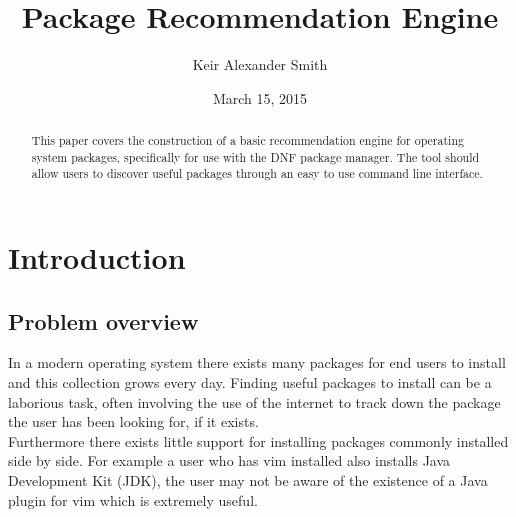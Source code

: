\documentclass{l4proj}
\begin{document}
\title{Package Recommendation Engine}
\author{Keir Alexander Smith}
\date{March 15, 2015}
\maketitle
 
\begin{abstract}
This paper covers the construction of a basic recommendation engine for operating system packages, specifically for use with the DNF package manager. The tool should allow users to discover useful packages through an easy to use command line interface.
\end{abstract}
 
\tableofcontents

\lstset{ %
language=Python,              %
basicstyle=\scriptsize,     %
numbers=left,               %
numberstyle=\scriptsize,    %
numbersep=10pt,             %
frame=trBL,                 %
captionpos=b,               %
breaklines=true,            %
breakatwhitespace=false,    %
showstringspaces=false,     %
frameround=fttt
}
 
 
\chapter{Introduction}
 
\section{Problem overview}
In a modern operating system there exists many packages for end users to install and this collection grows every day. Finding useful packages to install can be a laborious task, often involving the use of the internet to track down the package the user has been looking for, if it exists.\\
Furthermore there exists little support for installing packages commonly installed side by side. For example a user who has vim installed also installs Java Development Kit (JDK), the user may not be aware of the existence of a Java plugin for vim which is extremely useful.
\end{document}
